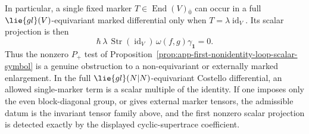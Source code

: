 \begin{prop}[Marked \(\mathcal B_{\operatorname{st}=0}\) and gauge-equivariant markers]
  In particular, a single fixed marker \(T\in\operatorname{End}(V){}_{\bar0}\)
  can occur in a full \(\lie{gl}(V)\)-equivariant marked differential only
  when \(T=\lambda\operatorname{id}_V\).  Its scalar projection is then
  \[
    \hbar\,\lambda\,\operatorname{Str}(\operatorname{id}_V)\,
    \omega(f,g)\gamma_{\mathbf 1}=0 .
  \]
  Thus the nonzero \(P_+\) test of
  Proposition~\ref{prop:app-first-nonidentity-loop-scalar-symbol} is a
  genuine obstruction to a non-equivariant or externally marked
  enlargement.  In the full
  \(\lie{gl}(N|N)\)-equivariant Costello differential, an allowed
  single-marker term is a scalar multiple of the identity.  If one imposes
  only the even block-diagonal group, or gives external marker
  tensors, the admissible datum is the invariant tensor family above, and
  the first nonzero scalar projection is detected exactly by the displayed
  cyclic-supertrace coefficient.
\end{prop}

